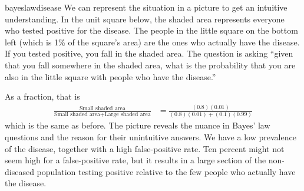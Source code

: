 \begin{answer}{bayeslawdisease}
We can represent the situation in a picture to get an intuitive understanding.
In the unit square below, the shaded area represents everyone who tested positive for the disease.
The people in the little square on the bottom left (which is 1\% of the square's area) are the ones who actually have the disease.
If you tested positive, you fall in the shaded area.
The question is asking ``given that you fall somewhere in the shaded area, what is the probability that you are also in the little square with people who have the disease.''
\begin{center}


\end{center}
As a fraction, that is
\begin{align*}
\frac{ \text{Small shaded area} }{ \text{Small shaded area}+\text{Large shaded area} }
&= \frac{ (0.8)(0.01) }{ (0.8)(0.01) + (0.1)(0.99)  }
\end{align*}
which is the same as before.
The picture reveals the nuance in Bayes' law questions and the reason for their unintuitive answers.
We have a low prevalence of the disease, together with a high false-positive rate.
Ten percent might not seem high for a false-positive rate, but it results in a large section of the non-diseased population testing positive relative to the few people who actually have the disease.



\end{answer}

